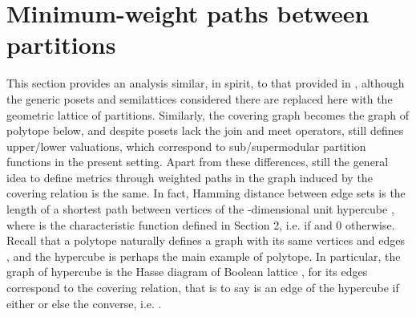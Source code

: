 \documentclass[a4paper,10pt]{article}
\begin{document}
\section{Minimum-weight paths between partitions}
This section provides an analysis similar, in spirit, to that provided in \cite[Section 3]{Monjardet1981}, although the generic posets and semilattices considered there are replaced
here with the geometric lattice of partitions. Similarly, the covering graph becomes the graph  of polytope  below, and despite posets lack the join and meet
operators, still \cite{Monjardet1981} defines upper/lower valuations, which correspond to sub/supermodular partition functions in the present setting. Apart from these
differences, still the general idea to define metrics through weighted paths in the graph induced by the covering relation is the same. In fact, 
Hamming distance  between edge sets  is the length of a shortest path between vertices  of the
-dimensional unit hypercube , where  is the characteristic function defined in Section 2, i.e.
 if  and 0 otherwise. Recall that a polytope naturally defines a graph with its same vertices and edges \cite[p. 93]{BronstedConvex}, and the
hypercube is perhaps the main example of polytope. In particular, the graph of hypercube  is the Hasse diagram of Boolean lattice , for its
edges correspond to the covering relation, that is to say  is an edge of the hypercube if either  or else the converse, i.e.
.
\end{document}
